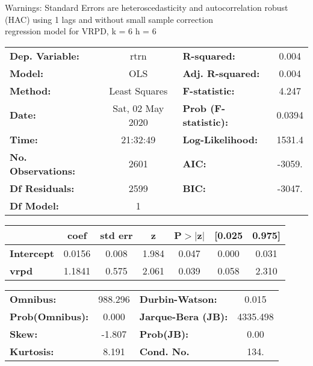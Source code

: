 Warnings: \newline
 [1] Standard Errors are heteroscedasticity and autocorrelation robust (HAC) using 1 lags and without small sample correction\\ 

regression model for VRPD, k = 6 h = 6\begin{center}
\begin{tabular}{lclc}
\toprule
\textbf{Dep. Variable:}    &       rtrn       & \textbf{  R-squared:         } &     0.004   \\
\textbf{Model:}            &       OLS        & \textbf{  Adj. R-squared:    } &     0.004   \\
\textbf{Method:}           &  Least Squares   & \textbf{  F-statistic:       } &     4.247   \\
\textbf{Date:}             & Sat, 02 May 2020 & \textbf{  Prob (F-statistic):} &   0.0394    \\
\textbf{Time:}             &     21:32:49     & \textbf{  Log-Likelihood:    } &    1531.4   \\
\textbf{No. Observations:} &        2601      & \textbf{  AIC:               } &    -3059.   \\
\textbf{Df Residuals:}     &        2599      & \textbf{  BIC:               } &    -3047.   \\
\textbf{Df Model:}         &           1      & \textbf{                     } &             \\
\bottomrule
\end{tabular}
\begin{tabular}{lcccccc}
                   & \textbf{coef} & \textbf{std err} & \textbf{z} & \textbf{P$> |$z$|$} & \textbf{[0.025} & \textbf{0.975]}  \\
\midrule
\textbf{Intercept} &       0.0156  &        0.008     &     1.984  &         0.047        &        0.000    &        0.031     \\
\textbf{vrpd}      &       1.1841  &        0.575     &     2.061  &         0.039        &        0.058    &        2.310     \\
\bottomrule
\end{tabular}
\begin{tabular}{lclc}
\textbf{Omnibus:}       & 988.296 & \textbf{  Durbin-Watson:     } &    0.015  \\
\textbf{Prob(Omnibus):} &   0.000 & \textbf{  Jarque-Bera (JB):  } & 4335.498  \\
\textbf{Skew:}          &  -1.807 & \textbf{  Prob(JB):          } &     0.00  \\
\textbf{Kurtosis:}      &   8.191 & \textbf{  Cond. No.          } &     134.  \\
\bottomrule
\end{tabular}
\end{center}

